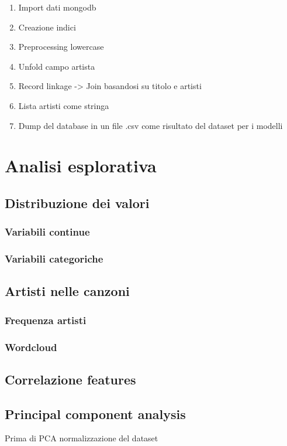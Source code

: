 \begin{enumerate}
	\item Import dati mongodb
	\item Creazione indici
	\item Preprocessing lowercase
	\item Unfold campo artista
	\item Record linkage -> Join basandosi su titolo e artisti
	\item Lista artisti come stringa
	\item Dump del database in un file .csv come risultato del dataset per i modelli
\end{enumerate}



\section{Analisi esplorativa}

\subsection{Distribuzione dei valori}
\subsubsection{Variabili continue}
\subsubsection{Variabili categoriche}

\subsection{Artisti nelle canzoni}
\subsubsection{Frequenza artisti}
\subsubsection{Wordcloud}


\subsection{Correlazione features}

\subsection{Principal component analysis}
Prima di PCA normalizzazione del dataset

